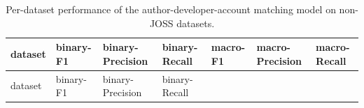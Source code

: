 \documentclass[
  letterpaper,
  DIV=11,
  numbers=noendperiod]{scrartcl}
\begin{document}
\begin{longtable}[]{@{}
  >{\raggedright\arraybackslash}p{}
  >{\raggedright\arraybackslash}p{}
  >{\raggedright\arraybackslash}p{}
  >{\raggedright\arraybackslash}p{}
  >{\raggedright\arraybackslash}p{}
  >{\raggedright\arraybackslash}p{}
  >{\raggedright\arraybackslash}p{}@{}}
\caption{Per-dataset performance of the author-developer-account
matching model on non-JOSS
datasets.}\label{tbl-em-model-non-joss-eval}\tabularnewline
\toprule\noalign{}
\begin{minipage}[b]{\linewidth}\raggedright
dataset
\end{minipage} & \begin{minipage}[b]{\linewidth}\raggedright
binary-F1
\end{minipage} & \begin{minipage}[b]{\linewidth}\raggedright
binary-Precision
\end{minipage} & \begin{minipage}[b]{\linewidth}\raggedright
binary-Recall
\end{minipage} & \begin{minipage}[b]{\linewidth}\raggedright
macro-F1
\end{minipage} & \begin{minipage}[b]{\linewidth}\raggedright
macro-Precision
\end{minipage} & \begin{minipage}[b]{\linewidth}\raggedright
macro-Recall
\end{minipage} \\
\midrule\noalign{}
\endfirsthead
\toprule\noalign{}
\begin{minipage}[b]{\linewidth}\raggedright
dataset
\end{minipage} & \begin{minipage}[b]{\linewidth}\raggedright
binary-F1
\end{minipage} & \begin{minipage}[b]{\linewidth}\raggedright
binary-Precision
\end{minipage} & \begin{minipage}[b]{\linewidth}\raggedright
binary-Recall
\end{minipage} & \begin{minipage}[b]{\linewidth}\raggedright

\end{minipage}
\end{longtable}
\end{document}
